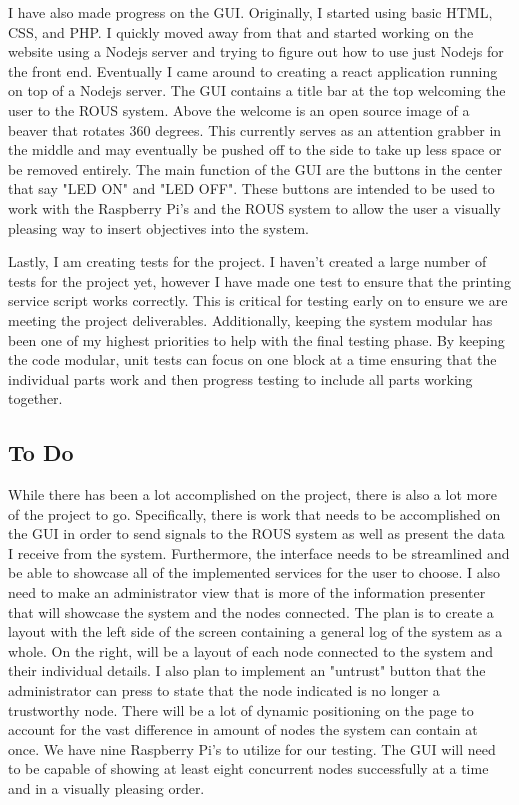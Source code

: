 \documentclass[draftclsnofoot, onecolumn, compsoc, 10pt]{IEEEtran}
\begin{document}
I have also made progress on the GUI. Originally, I started using basic HTML, CSS, and PHP. I quickly moved away from that and started working on the website using a Nodejs server and trying to figure out how to use just Nodejs for the front end. Eventually I came around to creating a react application running on top of a Nodejs server. The GUI contains a title bar at the top welcoming the user to the ROUS system.  Above the welcome is an open source image of a beaver that rotates 360 degrees. This currently serves as an attention grabber in the middle and may eventually be pushed off to the side to take up less space or be removed entirely. The main function of the GUI are the buttons in the center that say "LED ON" and "LED OFF". These buttons are intended to be used to work with the Raspberry Pi's and the ROUS system to allow the user a visually pleasing way to insert objectives into the system.

Lastly, I am creating tests for the project. I haven't created a large number of tests for the project yet, however I have made one test to ensure that the printing service script works correctly. This is critical for testing early on to ensure we are meeting the project deliverables. Additionally, keeping the system modular has been one of my highest priorities to help with the final testing phase. By keeping the code modular, unit tests can focus on one block at a time ensuring that the individual parts work and then progress testing to include all parts working together.

\subsection{To Do}
While there has been a lot accomplished on the project, there is also a lot more of the project to go. Specifically, there is work that needs to be accomplished on the GUI in order to send signals to the ROUS system as well as present the data I receive from the system. Furthermore, the interface needs to be streamlined and be able to showcase all of the implemented services for the user to choose. I also need to make an administrator view that is more of the information presenter that will showcase the system and the nodes connected. The plan is to create a layout with the left side of the screen containing a general log of the system as a whole. On the right, will be a layout of each node connected to the system and their individual details. I also plan to implement an "untrust" button that the administrator can press to state that the node indicated is no longer a trustworthy node. There will be a lot of dynamic positioning on the page to account for the vast difference in amount of nodes the system can contain at once. We have nine Raspberry Pi's to utilize for our testing. The GUI will need to be capable of showing at least eight concurrent nodes successfully at a time and in a visually pleasing order. 
\end{document}
